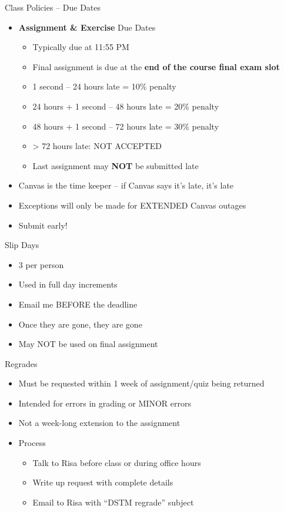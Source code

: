 \documentclass[aspectratio=169]{beamer}
\begin{document}
\begin{frame}{Class Policies -- Due Dates}

\begin{itemize}
\item  \textbf{Assignment \& Exercise} Due Dates
\begin{itemize}
\item Typically due at 11:55 PM
\item Final assignment is due at the \textbf{end of the course final exam slot}
\item 1 second -- 24 hours late = 10\% penalty
\item 24 hours + 1 second -- 48 hours late = 20\% penalty
\item 48 hours + 1 second -- 72 hours late = 30\% penalty
\item > 72 hours late: NOT ACCEPTED
\item Last assignment may \textbf{NOT} be submitted late
\end{itemize}
\item Canvas is the time keeper -- if Canvas says it's late, it's late
\item Exceptions will only be made for EXTENDED Canvas outages
\item Submit early!
\end{itemize}
\end{frame}


\begin{frame}{Slip Days}

\begin{itemize}
\item 3 per person
\item Used in full day increments
\item Email me BEFORE the deadline
\item Once they are gone, they are gone
\item May NOT be used on final assignment
\end{itemize}
\end{frame}
\begin{frame}{Regrades}
\begin{itemize}
\item  Must be requested within 1 week of assignment/quiz  being returned
\item Intended for errors in grading or MINOR errors
\item Not a week-long extension to the assignment
\item Process
\begin{itemize}
\item Talk to Risa before class or during office hours
\item Write up request with complete details
\item Email to Risa with ``DSTM regrade''  subject
\end{itemize}
\end{itemize}
\end{frame}
\end{document}
